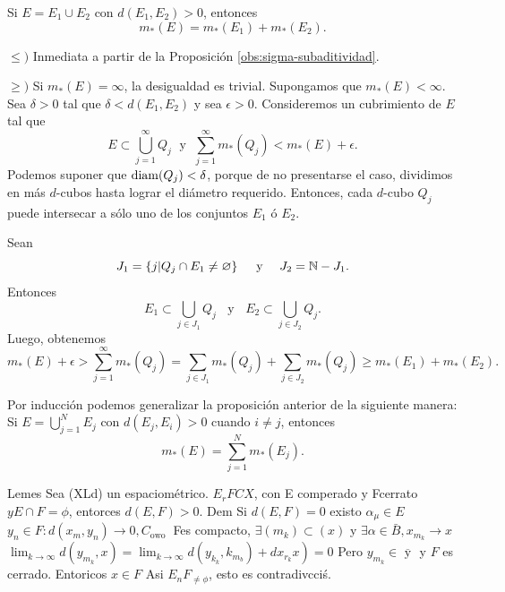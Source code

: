     
    \begin{proposicion}{}
        Si $E=E_1\cup E_2$ con $d(E_1,E_2)>0$, entonces
    \[
    m_{*}(E)=m_{*}(E_1)+m_{*}(E_2).
    \]
    \end{proposicion}

    
    \begin{demo}
    \noindent$\leq)$ Inmediata a partir de la Proposición \ref{obs:sigma-subaditividad}.
    
    \noindent$\geq)$
          Si $m_{*}(E)=\infty$,  la desigualdad es trivial.          Supongamos que $m_{*}(E)<\infty$.     Sea $\delta>0$ tal que $\delta <d(E_1, E_2)$ y sea $\epsilon>0$.
    Consideremos un cubrimiento de $E$ tal que 
    \[E\subset \bigcup\limits_{j=1}^{\infty} Q_j\;\mbox{  y }\;
    \sum\limits_{j=1}^{\infty} m_{*}(Q_j)<m_{*}(E)+\epsilon.\]
    Podemos suponer que $\operatorname{diam}(Q_j)<\delta$, porque de no presentarse el caso, dividimos en m\'as $d$-cubos hasta lograr el di\'ametro requerido.
    Entonces, cada $d$-cubo $Q_j$ puede intersecar a s\'olo uno de los conjuntos $E_1$ \'o $E_2$.

    Sean \[
    J_1=\left\{j|Q_j \cap E_1\neq \varnothing\right\}\quad\text{        y 
    }\quad
    J_2=\mathbb{N}-J_1.
    \]
Entonces
    \[
E_1\subset \bigcup\limits_{j\in J_1} Q_j \;\;\mbox { y }\;\;
E_2\subset \bigcup\limits_{j \in J_2} Q_j.
    \]
    Luego, obtenemos
    \[
    m_{*}(E)+\epsilon>\sum\limits_{j=1}^{\infty} m_{*}(Q_j)
    =\sum\limits_{j \in J_1} m_{*}(Q_j)+\sum\limits_{j\in J_2} m_{*}(Q_j)
    \geq 
    m_{*}(E_1)+m_{*}(E_2).
    \]
    \end{demo}
\begin{observacion}\label{obs:aditividad-cubos}  Por inducción podemos generalizar la proposición anterior de la siguiente manera:     Si $E=\bigcup_{j=1}^NE_j$ con $d(E_j,E_i)>0$ cuando $i\neq j$, entonces
    \[
    m_{*}(E)=\sum_{j=1}^Nm_{*}(E_j).
    \]
 \end{observacion}
 
 
 Lemes Sea (XLd) un espaciométrico. $E_r F C X$, con E comperado y Fcerrato $y E \cap F=\phi$, entorces $d(E, F)>0$.
Dem Si $d(E, F)=0$ existo $\alpha_\mu \in E$ $y_n \in F: d\left(x_m, y_n\right) \rightarrow 0, C_{\text {owo }}$ Fes compacto, $\exists\left(m_k\right) \subset(x)$ y $\exists \alpha \in \bar{B}, x_{m_k} \rightarrow x$ $\left.\lim _{k \rightarrow \infty} d\left(y_{m_k}, x\right)=\lim _{k \rightarrow \infty} d\left(y_{k_k}, k_{m_b}\right)+d x_{r_k} x\right)=0$ Pero $y_{m_k} \in \overline{\text { y }}$ y $F$ es cerrado. Entoricos $x \in F$ Asi $E_n F_{\neq \phi}$, esto es contradivcciś.
    
